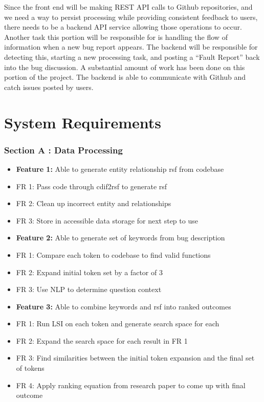 \documentclass[12pt]{article}
\begin{document}
Since the front end will be making REST API calls to Github
repositories, and we need a way to persist processing while providing
consistent feedback to users, there needs to be a backend API service
allowing those operations to occur. Another task this portion will be
responsible for is handling the flow of information when a new bug
report appears. The backend will be responsible for detecting this,
starting a new processing task, and posting a ``Fault Report'' back into
the bug discussion. A substantial amount of work has been done on this
portion of the project. The backend is able to communicate with Github
and catch issues posted by users.

\section{System Requirements}\label{system-requirements}

\subsubsection{Section A : Data
Processing}\label{section-a-data-processing}

\begin{itemize}
\item
  \textbf{Feature 1:} Able to generate entity relationship rsf from
  codebase
\item
  FR 1: Pass code through cdif2rsf to generate rsf
\item
  FR 2: Clean up incorrect entity and relationships
\item
  FR 3: Store in accessible data storage for next step to use
\item
  \textbf{Feature 2:} Able to generate set of keywords from bug
  description
\item
  FR 1: Compare each token to codebase to find valid functions
\item
  FR 2: Expand initial token set by a factor of 3
\item
  FR 3: Use NLP to determine question context
\item
  \textbf{Feature 3:} Able to combine keywords and rsf into ranked
  outcomes
\item
  FR 1: Run LSI on each token and generate search space for each
\item
  FR 2: Expand the search space for each result in FR 1
\item
  FR 3: Find similarities between the initial token expansion and the
  final set of tokens
\item
  FR 4: Apply ranking equation from research paper to come up with final
  outcome
\end{itemize}
\end{document}
